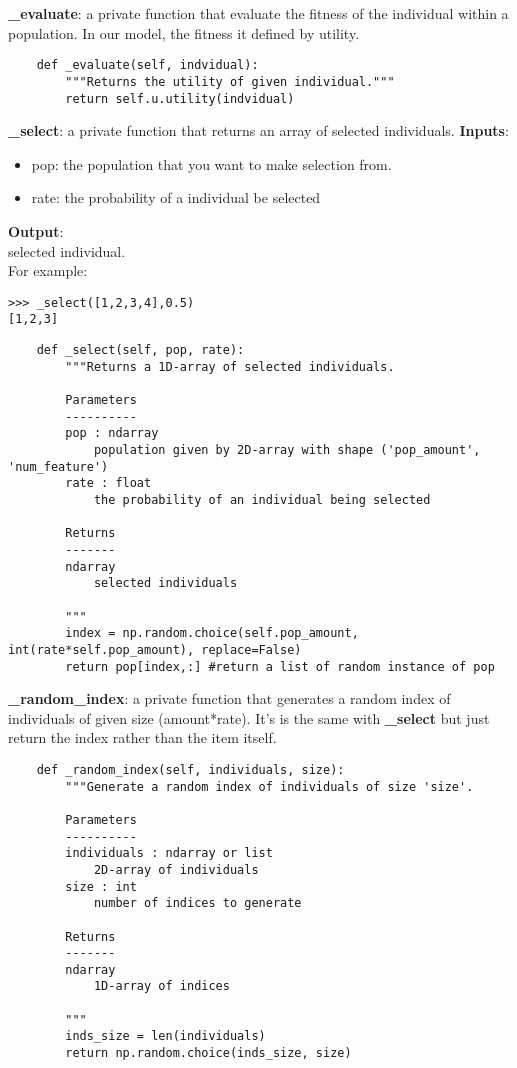 \documentclass[12pt]{article}
\begin{document}
\textbf{\_evaluate}: a private function that evaluate the fitness of the individual within a population. In our model, the fitness it defined by utility.
\begin{verbatim}
	def _evaluate(self, indvidual):
		"""Returns the utility of given individual."""
		return self.u.utility(indvidual)
\end{verbatim}
\textbf{\_select}: a private function that returns an array of selected individuals.
\textbf{Inputs}:
\begin{itemize}
  \item pop: the population that you want to make selection from.
  \item rate: the probability of a individual be selected
\end{itemize}
\textbf{Output}:\\
selected individual.\\
For example:
\begin{verbatim}
>>> _select([1,2,3,4],0.5)
[1,2,3]
\end{verbatim}
\begin{verbatim}
	def _select(self, pop, rate):
		"""Returns a 1D-array of selected individuals.
	
	    Parameters
	    ----------
	    pop : ndarray
	    	population given by 2D-array with shape ('pop_amount', 'num_feature')
	    rate : float
	    	the probability of an individual being selected
		
	    Returns
	    -------
	    ndarray
	    	selected individuals

		"""
		index = np.random.choice(self.pop_amount, int(rate*self.pop_amount), replace=False)
		return pop[index,:] #return a list of random instance of pop
\end{verbatim}
\textbf{\_random\_index}: a private function that generates a random index of individuals of given size (amount*rate). It's is the same with \textbf{\_select} but just return the index rather than the item itself.
\begin{verbatim}
	def _random_index(self, individuals, size):
		"""Generate a random index of individuals of size 'size'.

		Parameters
		----------
		individuals : ndarray or list
			2D-array of individuals
		size : int
			number of indices to generate
		
		Returns
		-------
		ndarray
			1D-array of indices

		"""
		inds_size = len(individuals)
		return np.random.choice(inds_size, size)
\end{verbatim}
\end{document}

